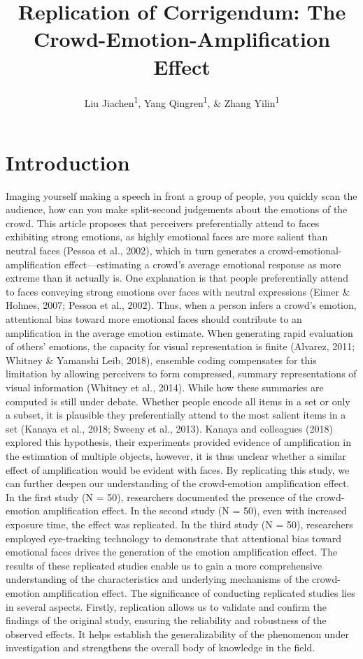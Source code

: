 \documentclass[
  man]{apa6}
\title{Replication of Corrigendum: The Crowd-Emotion-Amplification Effect}
\author{Liu Jiachen\textsuperscript{1}, Yang Qingren\textsuperscript{1}, \& Zhang Yilin\textsuperscript{1}}
\date{}
\affiliation{\vspace{0.5cm}\textsuperscript{1} Nanjing Normal University}
\begin{document}
\maketitle

\hypertarget{introduction}{%
\section{Introduction}\label{introduction}}

Imaging yourself making a speech in front a group of people, you quickly scan the audience, how can you make split-second judgements about the emotions of the crowd. This article proposes that perceivers preferentially attend to faces exhibiting strong emotions, as highly emotional faces are more salient than neutral faces (Pessoa et al., 2002), which in turn generates a crowd-emotional-amplification effect---estimating a crowd's average emotional response as more extreme than it actually is.
One explanation is that people preferentially attend to faces conveying strong emotions over faces with neutral expressions (Eimer \& Holmes, 2007; Pessoa et al., 2002). Thus, when a person infers a crowd's emotion, attentional bias toward more emotional faces should contribute to an amplification in the average emotion estimate.
When generating rapid evaluation of others' emotions, the capacity for visual representation is finite (Alvarez, 2011; Whitney \& Yamanshi Leib, 2018), ensemble coding compensates for this limitation by allowing perceivers to form compressed, summary representations of visual information (Whitney et al., 2014). While how these summaries are computed is still under debate. Whether people encode all items in a set or only a subset, it is plausible they preferentially attend to the most salient items in a set (Kanaya et al., 2018; Sweeny et al., 2013). Kanaya and colleagues (2018) explored this hypothesis, their experiments provided evidence of amplification in the estimation of multiple objects, however, it is thus unclear whether a similar effect of amplification would be evident with faces.
By replicating this study, we can further deepen our understanding of the crowd-emotion amplification effect. In the first study (N = 50), researchers documented the presence of the crowd-emotion amplification effect. In the second study (N = 50), even with increased exposure time, the effect was replicated. In the third study (N = 50), researchers employed eye-tracking technology to demonstrate that attentional bias toward emotional faces drives the generation of the emotion amplification effect. The results of these replicated studies enable us to gain a more comprehensive understanding of the characteristics and underlying mechanisms of the crowd-emotion amplification effect.
The significance of conducting replicated studies lies in several aspects. Firstly, replication allows us to validate and confirm the findings of the original study, ensuring the reliability and robustness of the observed effects. It helps establish the generalizability of the phenomenon under investigation and strengthens the overall body of knowledge in the field.
\end{document}
